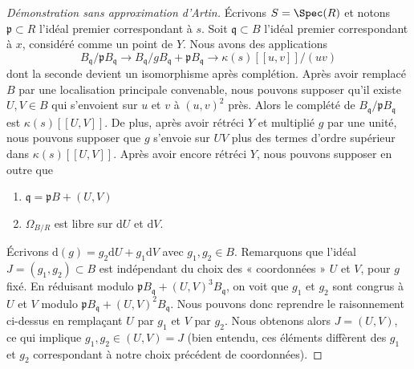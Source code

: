 \begin{proof}[Démonstration sans approximation d'Artin]
\medskip\noindent
Écrivons $S = \Spec(R)$ et notons $\mathfrak p \subset R$ l'idéal premier correspondant à $s$. Soit $\mathfrak q \subset B$ l'idéal premier correspondant à $x$, considéré comme un point de $Y$. Nous avons des applications $$
B_\mathfrak q / \mathfrak p B_\mathfrak q
\longrightarrow
B_\mathfrak q / g B_\mathfrak q + \mathfrak p B_\mathfrak q
\longrightarrow
\kappa(s)[[u, v]]/(uv)
$$ dont la seconde devient un isomorphisme après complétion. Après avoir remplacé $B$ par une localisation principale convenable, nous pouvons supposer qu'il existe $U, V \in B$ qui s'envoient sur $u$ et $v$ à $(u, v)^2$ près. Alors le complété de $B_\mathfrak q/\mathfrak p B_\mathfrak q$ est $\kappa(s)[[U, V]]$. De plus, après avoir rétréci $Y$ et multiplié $g$ par une unité, nous pouvons supposer que $g$ s'envoie sur $UV$ plus des termes d'ordre supérieur dans $\kappa(s)[[U, V]]$. Après avoir encore rétréci $Y$, nous pouvons supposer en outre que \begin{enumerate} \item $\mathfrak q = \mathfrak pB + (U, V)$ \item $\Omega_{B/R}$ est libre sur $\text{d}U$ et $\text{d}V$. \end{enumerate} Écrivons $\text{d}(g) = g_2 \text{d}U + g_1 \text{d}V$ avec $g_1, g_2 \in B$. Remarquons que l'idéal $J = (g_1, g_2) \subset B$ est indépendant du choix des « coordonnées » $U$ et $V$, pour $g$ fixé. En réduisant modulo $\mathfrak p B_\mathfrak q + (U, V)^3B_\mathfrak q$, on voit que $g_1$ et $g_2$ sont congrus à $U$ et $V$ modulo $\mathfrak p B_\mathfrak q + (U, V)^2B_\mathfrak q$. Nous pouvons donc reprendre le raisonnement ci-dessus en remplaçant $U$ par $g_1$ et $V$ par $g_2$. Nous obtenons alors $J = (U, V)$, ce qui implique $g_1, g_2 \in (U, V) = J$ (bien entendu, ces éléments diffèrent des $g_1$ et $g_2$ correspondant à notre choix précédent de coordonnées).


\end{proof}
